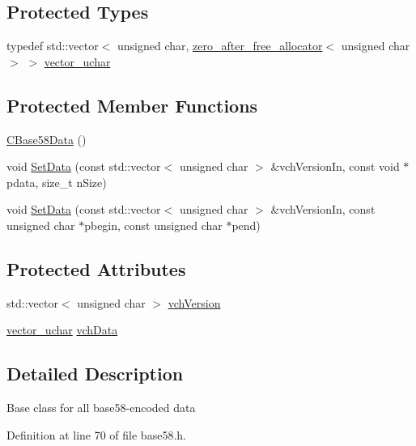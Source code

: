 \subsection*{Protected Types}
\begin{DoxyCompactItemize}
\item 
typedef std\+::vector$<$ unsigned char, \hyperlink{structzero__after__free__allocator}{zero\+\_\+after\+\_\+free\+\_\+allocator}$<$ unsigned char $>$ $>$ \hyperlink{class_c_base58_data_a193d64487a0b4f6df24f8bd380956ec1}{vector\+\_\+uchar}
\end{DoxyCompactItemize}
\subsection*{Protected Member Functions}
\begin{DoxyCompactItemize}
\item 
\hyperlink{class_c_base58_data_ae4f4ff42010299bc6fb228e21d6b2a15}{C\+Base58\+Data} ()
\item 
void \hyperlink{class_c_base58_data_afab1c06a0a4f631fd889434a2bc48c27}{Set\+Data} (const std\+::vector$<$ unsigned char $>$ \&vch\+Version\+In, const void $\ast$pdata, size\+\_\+t n\+Size)
\item 
void \hyperlink{class_c_base58_data_a8314b00685e590b4005be5cdfd36aeb9}{Set\+Data} (const std\+::vector$<$ unsigned char $>$ \&vch\+Version\+In, const unsigned char $\ast$pbegin, const unsigned char $\ast$pend)
\end{DoxyCompactItemize}
\subsection*{Protected Attributes}
\begin{DoxyCompactItemize}
\item 
std\+::vector$<$ unsigned char $>$ \hyperlink{class_c_base58_data_a110c1008f399053098a1bdf63408e923}{vch\+Version}
\item 
\hyperlink{class_c_base58_data_a193d64487a0b4f6df24f8bd380956ec1}{vector\+\_\+uchar} \hyperlink{class_c_base58_data_ae7ef7dfb93683aa4aaee8b74da5abb9c}{vch\+Data}
\end{DoxyCompactItemize}


\subsection{Detailed Description}
Base class for all base58-\/encoded data 

Definition at line 70 of file base58.\+h.




